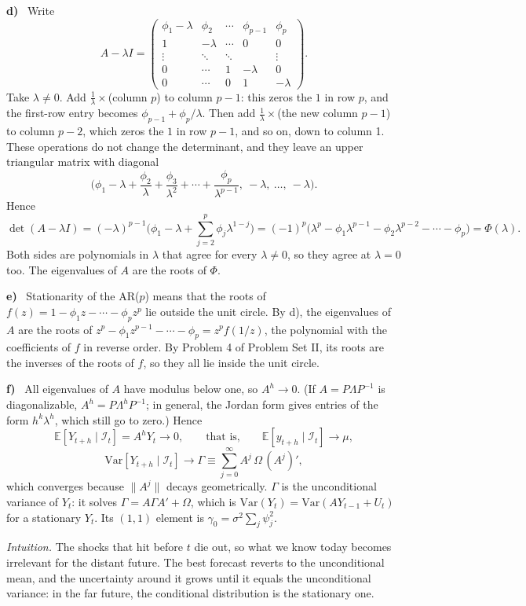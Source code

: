 \documentclass[11pt]{article}
\newcommand{\E}{\mathbb{E}}
\newcommand{\Var}{\mathrm{Var}}
\newcommand{\itm}[1]{\par\textbf{#1)}\ }
\begin{document}
\itm{d}
Write
\[
A-\lambda I=\begin{pmatrix}
\phi_1-\lambda&\phi_2&\cdots&\phi_{p-1}&\phi_p\\
1&-\lambda&\cdots&0&0\\
\vdots&\ddots&\ddots&&\vdots\\
0&\cdots&1&-\lambda&0\\
0&\cdots&0&1&-\lambda
\end{pmatrix}.
\]
Take $\lambda\neq0$. Add $\frac1\lambda\times$(column $p$) to column $p-1$: this zeros the $1$ in row $p$, and the first-row entry becomes $\phi_{p-1}+\phi_p/\lambda$. Then add $\frac1\lambda\times$(the new column $p-1$) to column $p-2$, which zeros the $1$ in row $p-1$, and so on, down to column 1. These operations do not change the determinant, and they leave an upper triangular matrix with diagonal
\[
\Big(\phi_1-\lambda+\frac{\phi_2}{\lambda}+\frac{\phi_3}{\lambda^2}+\cdots+\frac{\phi_p}{\lambda^{p-1}},\ -\lambda,\ \dots,\ -\lambda\Big).
\]
Hence
\[
\det(A-\lambda I)=(-\lambda)^{p-1}\Big(\phi_1-\lambda+\sum_{j=2}^p\phi_j\lambda^{1-j}\Big)
=(-1)^{p}\big(\lambda^p-\phi_1\lambda^{p-1}-\phi_2\lambda^{p-2}-\cdots-\phi_p\big)=\Phi(\lambda).
\]
Both sides are polynomials in $\lambda$ that agree for every $\lambda\neq0$, so they agree at $\lambda=0$ too. The eigenvalues of $A$ are the roots of $\Phi$.

\itm{e}
Stationarity of the AR($p$) means that the roots of $f(z)=1-\phi_1z-\cdots-\phi_pz^p$ lie outside the unit circle. By d), the eigenvalues of $A$ are the roots of $z^p-\phi_1z^{p-1}-\cdots-\phi_p=z^pf(1/z)$, the polynomial with the coefficients of $f$ in reverse order. By Problem 4 of Problem Set II, its roots are the inverses of the roots of $f$, so they all lie inside the unit circle.

\itm{f}
All eigenvalues of $A$ have modulus below one, so $A^h\to0$. (If $A=P\Lambda P^{-1}$ is diagonalizable, $A^h=P\Lambda^hP^{-1}$; in general, the Jordan form gives entries of the form $h^k\lambda^h$, which still go to zero.) Hence
\[
\E[Y_{t+h}\mid\mathcal I_t]=A^hY_t\to0,\qquad\text{that is,}\qquad\E[y_{t+h}\mid\mathcal I_t]\to\mu,
\]
\[
\Var[Y_{t+h}\mid\mathcal I_t]\to\Gamma\equiv\sum_{j=0}^\infty A^j\,\Omega\,(A^j)' ,
\]
which converges because $\|A^j\|$ decays geometrically. $\Gamma$ is the unconditional variance of $Y_t$: it solves $\Gamma=A\Gamma A'+\Omega$, which is $\Var(Y_t)=\Var(AY_{t-1}+U_t)$ for a stationary $Y_t$. Its $(1,1)$ element is $\gamma_0=\sigma^2\sum_j\psi_j^2$.

\emph{Intuition.} The shocks that hit before $t$ die out, so what we know today becomes irrelevant for the distant future. The best forecast reverts to the unconditional mean, and the uncertainty around it grows until it equals the unconditional variance: in the far future, the conditional distribution is the stationary one.
\end{document}

